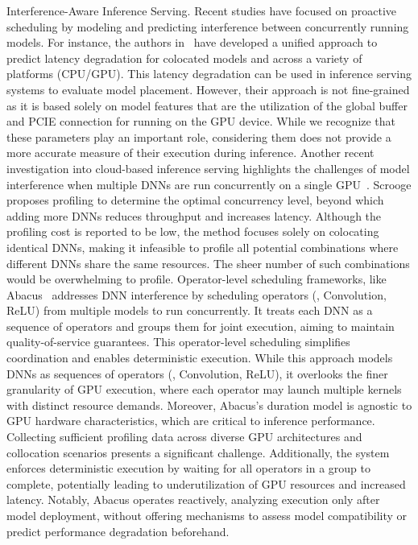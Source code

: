   Interference-Aware Inference Serving.
  Recent studies have focused on proactive scheduling by modeling and predicting interference between concurrently running models. For instance, the authors in~\cite{mendoza2021interference} have developed a unified approach to predict latency degradation for colocated models and across a variety of platforms (CPU/GPU). This latency degradation can be used in inference serving systems to evaluate model placement. However, their approach is not fine-grained as it is based solely on model features that are the utilization of the global buffer and PCIE connection for running on the GPU device. While we recognize that these parameters play an important role, considering them does not provide a more accurate measure of their execution during inference. 
  Another recent investigation into cloud-based inference serving highlights the challenges of model interference when multiple DNNs are run concurrently on a single GPU~\cite{hu2021scrooge}. Scrooge proposes profiling to determine the optimal concurrency level, beyond which adding more DNNs reduces throughput and increases latency. Although the profiling cost is reported to be low, the method focuses solely on colocating identical DNNs, making it infeasible to profile all potential combinations where different DNNs share the same resources. The sheer number of such combinations would be overwhelming to profile.
  Operator-level scheduling frameworks, like Abacus~\cite{cui2021Abacus} addresses DNN interference by scheduling operators (\eg, Convolution, ReLU) from multiple models to run concurrently. It treats each DNN as a sequence of operators and groups them for joint execution, aiming to maintain quality-of-service guarantees. This operator-level scheduling simplifies coordination and enables deterministic execution.
  While this approach models DNNs as sequences of operators (\eg, Convolution, ReLU), it overlooks the finer granularity of GPU execution, where each operator may launch multiple kernels with distinct resource demands. Moreover, Abacus's duration model is agnostic to GPU hardware characteristics, which are critical to inference performance. Collecting sufficient profiling data across diverse GPU architectures and collocation scenarios presents a significant challenge. Additionally, the system enforces deterministic execution by waiting for all operators in a group to complete, potentially leading to underutilization of GPU resources and increased latency. Notably, Abacus operates reactively, analyzing execution only after model deployment, without offering mechanisms to assess model compatibility or predict performance degradation beforehand.

